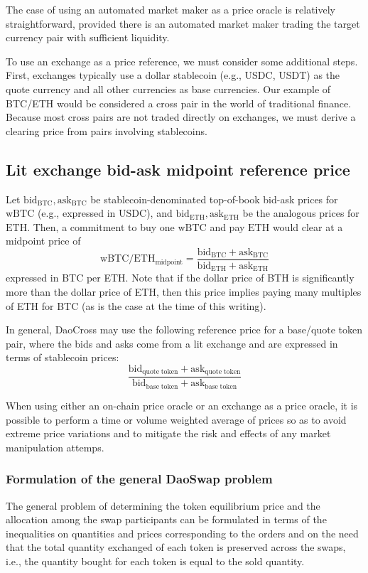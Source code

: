 \documentclass[11pt, reqno]{amsart}
\newcommand{\bidbtc}{\mathrm{bid}_\mathrm{BTC}}
\newcommand{\askbtc}{\mathrm{ask}_\mathrm{BTC}}
\newcommand{\bideth}{\mathrm{bid}_\mathrm{ETH}}
\newcommand{\asketh}{\mathrm{ask}_\mathrm{ETH}}
\newcommand{\bidbase}{\mathrm{bid}_\mathrm{quote\;token}}
\newcommand{\askbase}{\mathrm{ask}_\mathrm{quote\;token}}
\newcommand{\bidquote}{\mathrm{bid}_\mathrm{base\;token}}
\newcommand{\askquote}{\mathrm{ask}_\mathrm{base\;token}}
\newcommand{\BTC}{\mathrm{wBTC}}
\newcommand{\ETH}{\mathrm{ETH}}
\newcommand{\USDC}{\mathrm{USDC}}
\newcommand{\midpoint}{\mathrm{midpoint}}
\begin{document}
The case of using an automated market maker as a price oracle is relatively
straightforward, provided there is an automated market maker trading the
target currency pair with sufficient liquidity.

To use an exchange as a price reference, we must consider some additional
steps. First, exchanges typically use a dollar stablecoin (e.g., USDC, USDT) as
the quote currency and all other currencies as base currencies. Our example
of BTC/ETH would be considered a cross pair in the world of traditional
finance. Because most cross pairs are not traded directly on exchanges, we
must derive a clearing price from pairs involving stablecoins.

\subsection{Lit exchange bid-ask midpoint reference price}
Let $\bidbtc, \askbtc$ be stablecoin-denominated top-of-book bid-ask prices
for $\BTC$ (e.g., expressed in $\USDC$), and $\bideth, \asketh$ be the analogous
prices for $\ETH$. Then, a commitment to buy one $\BTC$ and pay $\ETH$ would
clear at a midpoint price of
\[
	\BTC/\ETH_{\midpoint} = \frac{\bidbtc + \askbtc}{\bideth + \asketh}
\]
expressed in BTC per ETH. Note that if the dollar price of BTH is significantly
more than the dollar price of ETH, then this price implies paying many
multiples of ETH for BTC (as is the case at the time of this writing).

In general, DaoCross may use the following reference price for a base/quote
token pair, where the bids and asks come from a lit exchange and are expressed
in terms of stablecoin prices:
\begin{equation}
	\frac{\bidbase + \askbase}{\bidquote + \askquote}
\end{equation}

When using either an on-chain price oracle or an exchange as a price oracle,
it is possible to perform a time or volume weighted average of prices so as
to avoid extreme price variations and to mitigate the risk and effects of any
market manipulation attemps.

\subsubsection{Formulation of the general DaoSwap problem}
The general problem of determining the token equilibrium price and the
allocation among the swap participants can be formulated in terms of the
inequalities on quantities and prices corresponding to the orders and on the
need that the total quantity exchanged of each token is preserved across the
swaps, i.e., the quantity bought for each token is equal to the sold quantity.
\end{document}
